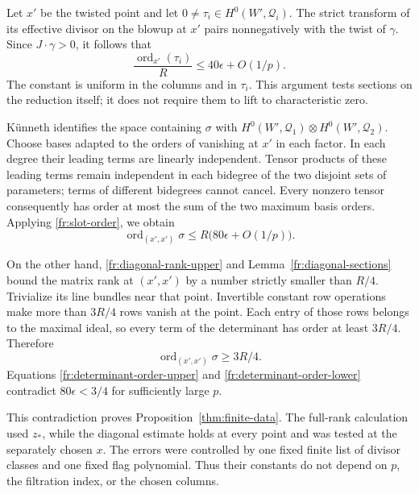 \documentclass[12pt,a4paper,psamsfonts]{amsart}
\theoremstyle{definition}
\theoremstyle{plain}
\DeclareMathOperator{\ord}{ord}
\begin{document}
Let $x'$ be the twisted point and let $0\ne\tau_i\in
H^0(W',\mathcal Q_i)$.  The strict transform of its effective divisor on
the blowup at $x'$ pairs nonnegatively with the twist of $\gamma$.
Since $J\cdot\gamma>0$, it follows that
\begin{equation}\label{fr:slot-order}
 \frac{\ord_{x'}(\tau_i)}R\le40\epsilon+O(1/p).
\end{equation}
The constant is uniform in the columns and in $\tau_i$.  This
argument tests sections on the reduction itself; it does not
require them to lift to characteristic zero.

K\"unneth identifies the space containing $\sigma$ with
$H^0(W',\mathcal Q_1)\otimes H^0(W',\mathcal Q_2)$.  Choose bases adapted to the
orders of vanishing at $x'$ in each factor.  In each degree their
leading terms are linearly independent.  Tensor products of these
leading terms remain independent in each bidegree of the two
disjoint sets of parameters; terms of different bidegrees cannot
cancel.  Every nonzero tensor consequently has order at most the
sum of the two maximum basis orders.  Applying
\eqref{fr:slot-order}, we obtain
\begin{equation}\label{fr:determinant-order-upper}
 \ord_{(x',x')}\sigma\le R\bigl(80\epsilon+O(1/p)\bigr).
\end{equation}

On the other hand, \eqref{fr:diagonal-rank-upper} and
Lemma~\ref{fr:diagonal-sections} bound the matrix rank at $(x',x')$
by a number strictly smaller
than $R/4$.  Trivialize its line bundles near that point.  Invertible
constant row operations make more than $3R/4$ rows vanish at the
point.  Each entry of those rows belongs to the maximal ideal, so
every term of the determinant has order at least $3R/4$.  Therefore
\begin{equation}\label{fr:determinant-order-lower}
 \ord_{(x',x')}\sigma\ge3R/4.
\end{equation}
Equations \eqref{fr:determinant-order-upper} and
\eqref{fr:determinant-order-lower} contradict
$80\epsilon<3/4$ for sufficiently large $p$.


This contradiction proves Proposition~\ref{thm:finite-data}.
The full-rank calculation used $z_*$, while the diagonal estimate
holds at every point and was tested at the separately chosen $x$.
The errors were controlled by one fixed finite list of divisor
classes and one fixed flag polynomial. Thus their constants do
not depend on $p$, the filtration index, or the chosen columns.
\end{document}
